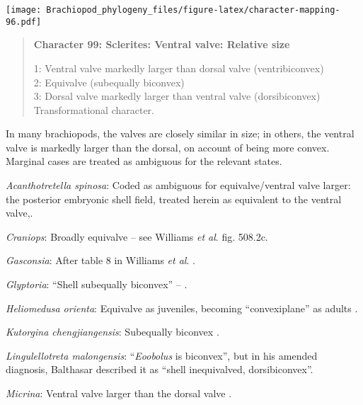 \documentclass[openany]{book}
\theoremstyle{definition}
\theoremstyle{definition}
\theoremstyle{definition}
\theoremstyle{remark}
\begin{document}
\texttt{[image: Brachiopod\_phylogeny\_files/figure-latex/character-mapping-96.pdf]}

\begin{quote}
\textbf{Character 99: Sclerites: Ventral valve: Relative size}

1: Ventral valve markedly larger than dorsal valve (ventribiconvex)\\
2: Equivalve (subequally biconvex)\\
3: Dorsal valve markedly larger than ventral valve (dorsibiconvex)\\
Transformational character.
\end{quote}

In many brachiopods, the valves are closely similar in size; in others,
the ventral valve is markedly larger than the dorsal, on account of
being more convex. Marginal cases are treated as ambiguous for the
relevant states.

\hypertarget{Acanthotretella_spinosa-coding-99}{}
\emph{Acanthotretella spinosa}: Coded as ambiguous for equivalve/ventral
valve larger: the posterior embryonic shell field, treated herein as
equivalent to the ventral valve,.

\hypertarget{Craniops-coding-99}{}
\emph{Craniops}: Broadly equivalve -- see Williams \emph{et al}.
\citeyearpar{Williams2000LinguliformeaCraniiformea} fig. 508.2c.

\hypertarget{Gasconsia-coding-99}{}
\emph{Gasconsia}: After table 8 in Williams \emph{et al}.
\citeyearpar{Williams2000LinguliformeaCraniiformea}.

\hypertarget{Glyptoria-coding-99}{}
\emph{Glyptoria}: ``Shell subequally biconvex'' --
\citet{Williams2000LinguliformeaCraniiformea}.

\hypertarget{Heliomedusa_orienta-coding-99}{}
\emph{Heliomedusa orienta}: Equivalve as juveniles, becoming
``convexiplane'' \citep[p.~187]{Williams2000LinguliformeaCraniiformea}
as adults \citep{Hanken1985Thetaxonomy}.

\hypertarget{Kutorgina_chengjiangensis-coding-99}{}
\emph{Kutorgina chengjiangensis}: Subequally biconvex
\citep[p.~192]{Williams2000LinguliformeaCraniiformea}.

\hypertarget{Lingulellotreta_malongensis-coding-99}{}
\emph{Lingulellotreta malongensis}: ``\emph{Eoobolus} is biconvex'', but
in his amended diagnosis, Balthasar
\citeyearpar{Balthasar2009Thebrachiopod} described it as ``shell
inequivalved, dorsibiconvex''.

\hypertarget{Micrina-coding-99}{}
\emph{Micrina}: Ventral valve larger than the dorsal valve
\citep[p.~659]{Zhang2009Architectureand}.
\end{document}
